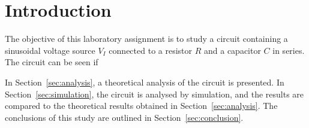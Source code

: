 \section{Introduction}
\label{sec:introduction}

The objective of this laboratory assignment is to study a circuit containing a
sinusoidal voltage source $V_I$ connected to a resistor $R$ and a capacitor $C$
in series. The circuit can be seen if %

\lipsum[1-1]

In Section~\ref{sec:analysis}, a theoretical analysis of the circuit is
presented. In Section~\ref{sec:simulation}, the circuit is analysed by
simulation, and the results are compared to the theoretical results obtained in
Section~\ref{sec:analysis}. The conclusions of this study are outlined in
Section~\ref{sec:conclusion}.



